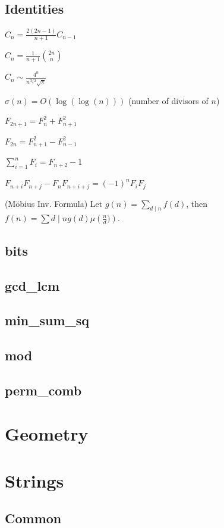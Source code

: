 \subsection{Identities}
{
$C_n = \frac{2(2n-1)}{n+1} C_{n-1}$

$C_n = \frac{1}{n+1} \binom{2n}{n}$

$C_n \sim \frac{4^n}{n^{3/2}\sqrt{\pi}}$

$\sigma(n) = O(\log(\log(n)))$ (number of divisors of $n$)

$F_{2n+1} = F_{n}^2 + F_{n+1}^2$

$F_{2n} = F_{n+1}^2 - F_{n-1}^2$

$\sum_{i=1}^n F_i = F_{n+2}-1$

$F_{n+i}F_{n+j} - F_nF_{n+i+j} = (-1)^n F_iF_j$

(Möbius Inv. Formula)
Let $g(n) = \sum_{d\mid n} f(d)$, then $f(n)=\sum{d\mid n} g(d) \mu\left(\frac{n}{d})\right)$.
}
\subsection{bits}
\subsection{gcd_lcm}
\subsection{min_sum_sq}
\subsection{mod}
\subsection{perm_comb}

\section{Geometry}


\section{Strings}
\subsection{Common}
